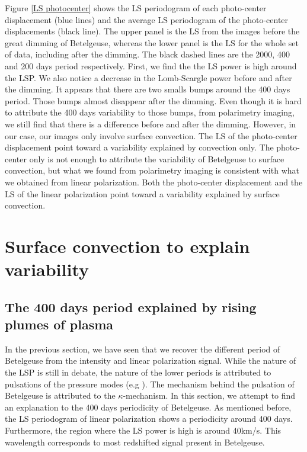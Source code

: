 \documentclass{aa}
\begin{document}
Figure \ref{LS photocenter} shows the LS periodogram of each photo-center displacement (blue lines) and the average LS periodogram of the photo-center displacements (black line). 
The upper panel is the LS from the images before the great dimming of Betelgeuse, whereas the lower panel is the LS for the whole set of data, 
including after the dimming. The black dashed lines are the 2000, 400 and 200 days period respectively. First, we find the the LS power is high around the LSP.
We also notice a decrease in the Lomb-Scargle power before and after the dimming. It appears that there are two smalls bumps around the 400 days period. 
Those bumps almost disappear after the dimming. Even though it is hard to attribute the 400 days variability to those bumps, from polarimetry imaging,
we still find that there is a difference before and after the dimming. However, in our case, our images only involve surface convection.
The LS of the photo-center displacement point toward a variability explained by convection only. The photo-center only is not enough to attribute the variability
of Betelgeuse to surface convection, but what we found from polarimetry imaging is consistent with what we obtained from linear polarization.
Both the photo-center displacement and the LS of the linear polarization point toward a variability explained by surface convection.  




\section{Surface convection to explain variability}

\subsection{The 400 days period explained by rising plumes of plasma}

In the previous section, we have seen that we recover the different period of Betelgeuse from the intensity and linear polarization signal. 
While the nature of the LSP is still in debate, the nature of the lower periods is attributed to pulsations of the pressure modes 
(e.g \cite{kiss_variability_2006}). The mechanism behind the pulsation of Betelgeuse is attributed to the $\kappa$-mechanism. In this section, we attempt to 
find an explanation to the 400 days periodicity of Betelgeuse. As mentioned before, the LS periodogram of linear polarization shows a periodicity 
around 400 days. Furthermore, the region where the LS power is high is around 40km/s. This wavelength corresponds to most redshifted signal present in Betelgeuse.
\end{document}
